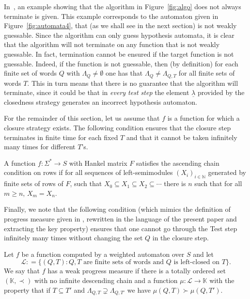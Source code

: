 \documentclass{lmcs}
\numberwithin{theorem}{section}
\begin{document}
\begin{rem} 
In~\cite{HKRS20}, an example showing that the algorithm in Figure~\ref{fig:algo} does not always terminate is given. This example corresponds to the automaton given in Figure~\ref{fig:automata4}, that (as we shall see in the next section) is not weakly guessable. Since the algorithm can only guess hypothesis automata, it is clear that the algorithm will not terminate on any function that is not weakly guessable. In fact, termination  cannot be ensured if the target function is not guessable. Indeed, if the function is not guessable, then (by definition) for each finite set of words $Q$ with $\Lambda_Q \neq \emptyset$ one has that $\Lambda_Q \neq \Lambda_{Q, T}$ for all finite sets of words $T$. This in turn means that there is no guarantee that the algorithm will terminate, since it could be that in \emph{every test step} the  element $\underline{\lambda}$ provided by the closedness strategy generates an incorrect hypothesis automaton. \end{rem}

For the remainder of this section, let us assume that $f$ is a function for which a closure strategy exists. The following  condition ensures that the closure step terminates in finite time for each fixed $T$ and that it cannot be taken infinitely many times for different $T$'s.

\begin{defi}
	A function $f:\Sigma^* \to S$ with Hankel matrix $F$ satisfies the ascending chain condition on rows if for all sequences of left-semimodules $(X_i)_{i \in \mathbb{N}}$ generated by finite sets of rows of $F$, such that $X_0 \subseteq X_1 \subseteq X_2 \subseteq \cdots$
	there is $n$ such that for all $m \geq n$, $X_m = X_n$.
\end{defi}

Finally, we note that the following condition (which mimics the definition of progress measure given in \cite{HKRS20}, rewritten in the language of the present paper and extracting the key property) ensures that one cannot go through the Test step infinitely many times without changing the set $Q$ in the closure step. 

\begin{defi}
	Let $f$ be a function computed by a weighted automaton over $S$ and let
    $$\mathcal{L}: =\{(Q,T): Q, T \mbox{ are finite sets of words and } Q \mbox{ is left-closed on }T\}.$$
     We say that $f$ has a weak progress measure if there is a totally ordered set $(\mathbb{K},\prec)$ with no infinite descending chain and a function $\mu: \mathcal{L} \rightarrow \mathbb{K}$ with the property that if $T \subseteq T'$ and $\Lambda_{Q, T} \supsetneq \Lambda_{Q, T'}$  we have $\mu(Q, T)\succ  \mu(Q, T')$. 
\end{defi}
\end{document}
